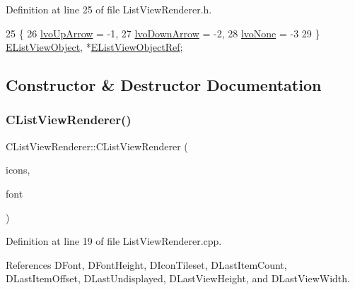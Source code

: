 Definition at line 25 of file List\+View\+Renderer.\+h.


\begin{DoxyCode}
25                     \{
26             \hyperlink{classCListViewRenderer_a120f3c9b0b96dd6e9bce814a52aafb93a097e5e7377e3436187159f67e1aafbe1}{lvoUpArrow} = -1,
27             \hyperlink{classCListViewRenderer_a120f3c9b0b96dd6e9bce814a52aafb93af916162772cb53552d541174c8354036}{lvoDownArrow} = -2,
28             \hyperlink{classCListViewRenderer_a120f3c9b0b96dd6e9bce814a52aafb93a2c1b367eb65f29abd94562e57d58560a}{lvoNone} = -3
29         \} \hyperlink{classCListViewRenderer_a120f3c9b0b96dd6e9bce814a52aafb93}{EListViewObject}, *\hyperlink{classCListViewRenderer_a480fc50c1a5f78ff25b83a8c7973ebd3}{EListViewObjectRef};
\end{DoxyCode}


\subsection{Constructor \& Destructor Documentation}
\hypertarget{classCListViewRenderer_af84040577d38c39d1e7bbf7b5e62bd74}{}\label{classCListViewRenderer_af84040577d38c39d1e7bbf7b5e62bd74} 
\subsubsection{\texorpdfstring{C\+List\+View\+Renderer()}{CListViewRenderer()}}
{\footnotesize\ttfamily C\+List\+View\+Renderer\+::\+C\+List\+View\+Renderer (\begin{DoxyParamCaption}\item[{std\+::shared\+\_\+ptr$<$ \hyperlink{classCGraphicTileset}{C\+Graphic\+Tileset} $>$}]{icons,  }\item[{std\+::shared\+\_\+ptr$<$ \hyperlink{classCFontTileset}{C\+Font\+Tileset} $>$}]{font }\end{DoxyParamCaption})}



Definition at line 19 of file List\+View\+Renderer.\+cpp.



References D\+Font, D\+Font\+Height, D\+Icon\+Tileset, D\+Last\+Item\+Count, D\+Last\+Item\+Offset, D\+Last\+Undisplayed, D\+Last\+View\+Height, and D\+Last\+View\+Width.


